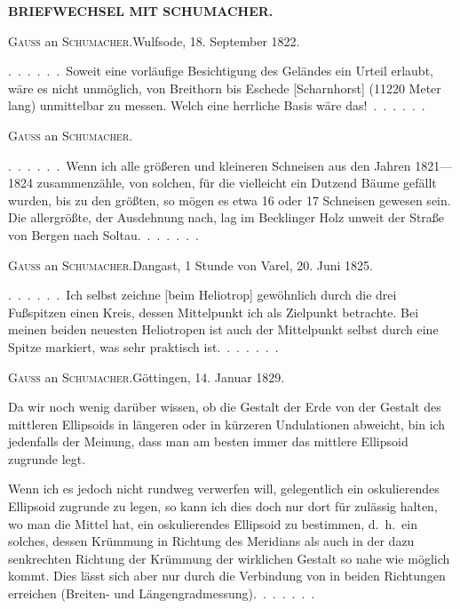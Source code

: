\clearpage
{}\hfill\textbf{BRIEFWECHSEL MIT SCHUMACHER.}
\begin{center}\textsc{Gauss} an \textsc{Schumacher}.\quad Wulfsode, 18. September 1822.\end{center}

.\ .\ .\ .\ .\ .\ Soweit eine vorläufige Besichtigung des Geländes ein Urteil erlaubt,
wäre es nicht unmöglich,  von Breithorn bis Eschede
[Scharnhorst] (11220 Meter lang) unmittelbar zu messen. Welch eine herrliche
Basis wäre das!\ .\ .\ .\ .\ .\ .

\begin{center}\textsc{Gauss} an \textsc{Schumacher}.\end{center}

.\ .\ .\ .\ .\ .\ Wenn ich alle größeren und kleineren Schneisen aus den Jahren
1821---1824 zusammenzähle, von solchen, für die vielleicht ein Dutzend Bäume
gefällt wurden, bis zu den größten, so mögen es etwa 16 oder 17 Schneisen gewesen
sein. Die allergrößte, der Ausdehnung nach, lag im Becklinger
Holz unweit der Straße von Bergen nach Soltau.\ .\ .\ .\ .\ .\ .

\begin{center}\textsc{Gauss} an \textsc{Schumacher}.\quad Dangast, 1 Stunde von Varel, 20. Juni 1825.\end{center}

.\ .\ .\ .\ .\ .\ Ich selbst zeichne [beim Heliotrop] gewöhnlich durch die drei Fußspitzen
einen Kreis, dessen Mittelpunkt ich als Zielpunkt betrachte.
Bei meinen beiden neuesten Heliotropen ist auch der Mittelpunkt selbst durch eine
Spitze markiert, was sehr praktisch ist.\ .\ .\ .\ .\ .\ .

\begin{center}\textsc{Gauss} an \textsc{Schumacher}.\quad Göttingen, 14. Januar 1829.\end{center}

Da wir noch wenig darüber wissen, ob die Gestalt der Erde von der Gestalt
des mittleren Ellipsoids in längeren oder in kürzeren Undulationen abweicht,
bin ich jedenfalls der Meinung, dass man am besten immer das mittlere
Ellipsoid zugrunde legt.

Wenn ich es jedoch nicht rundweg verwerfen will, gelegentlich ein
oskulierendes Ellipsoid zugrunde zu legen, so kann ich dies doch nur dort
für zulässig halten, wo man die Mittel hat, ein oskulierendes Ellipsoid zu bestimmen,
d.\ h.\ ein solches, dessen Krümmung  in Richtung des Meridians
als auch in der dazu senkrechten Richtung der Krümmung der wirklichen Gestalt so nahe wie
möglich kommt. Dies lässt sich aber nur durch die Verbindung von 
in beiden Richtungen erreichen (Breiten- und Längengradmessung).\ .\ .\ .\ .\ .\ .

